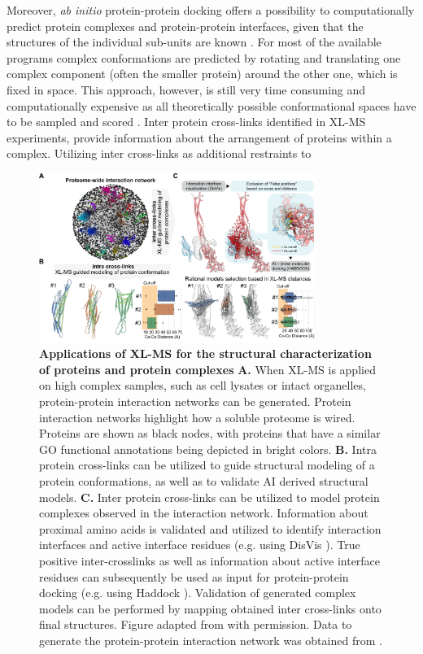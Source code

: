 Moreover, \emph{ab initio} protein-protein docking offers a possibility to computationally predict protein complexes and protein-protein interfaces, given that the structures of the individual sub-units are known \cite{Dominguez_2003, Vakser_2014}. For most of the available programs complex conformations are predicted by rotating and translating one complex component (often the smaller protein) around the other one, which is fixed in space. This approach, however, is still very time consuming and computationally expensive as all theoretically possible conformational spaces have to be sampled and scored \cite{Dominguez_2003, van_Zundert_2016}. Inter protein cross-links identified in XL-MS experiments, provide information about the arrangement of proteins within a complex. Utilizing inter cross-links as additional restraints to\\ 

\begin{figure}[hbt!]
\center
\includegraphics[width=0.8\textwidth]{Chapter.1/Figures/Figure4.png} 
\caption{\textbf{Applications of XL-MS for the structural characterization of proteins and protein complexes} \textbf{A.} When XL-MS is applied on high complex samples, such as cell lysates or intact organelles, protein-protein interaction networks can be generated. Protein interaction networks highlight how a soluble proteome is wired. Proteins are shown as black nodes, with proteins that have a similar GO functional annotations \cite{Ashburner_2000} being depicted in bright colors. \textbf{B.} Intra protein cross-links can be utilized to guide structural modeling of a protein conformations, as well as to validate AI derived structural models. \textbf{C.} Inter protein cross-links can be utilized to model protein complexes observed in the interaction network. Information about proximal amino acids is validated and utilized to identify interaction interfaces and active interface residues (e.g. using DisVis \cite{van_Zundert_2015}). True positive inter-crosslinks as well as information about active interface residues can subsequently be used as input for protein-protein docking (e.g. using Haddock \cite{van_Zundert_2016}). Validation of generated complex models can be performed by mapping obtained inter cross-links onto final structures. Figure adapted from \cite{Lagerwaard_2022} with permission. Data to generate the protein-protein interaction network was obtained from \cite{Costanzo_2016}.}
\label{fig:fig4}
\end{figure}

